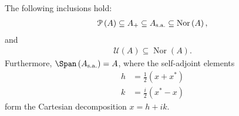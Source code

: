 \begin{fact}
  The following inclusions hold:
  \begin{align*}
    \mathcal{P}\left(A\right) \subseteq A_{+} \subseteq A_{\operatorname{s.a.}}\subseteq \operatorname{Nor}\left(A\right),
  \end{align*}
  and
  \begin{align*}
    \mathcal{U}\left(A\right)\subseteq \operatorname{Nor}\left(A\right).
  \end{align*}
  Furthermore, $\Span\left(A_{\sa}\right) = A$, where the self-adjoint elements
  \begin{align*}
    h &= \frac{1}{2}\left(x + x^{\ast}\right)\\
    k &= \frac{i}{2}\left(x^{\ast}-x\right)
  \end{align*}
  form the Cartesian decomposition $x = h + ik$.
\end{fact}
